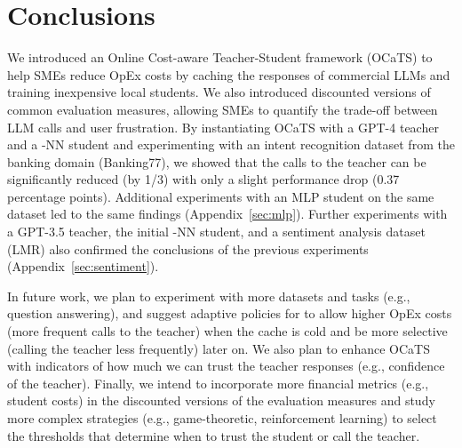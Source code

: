 \documentclass[11pt]{article}
\begin{document}
\section{Conclusions}
We introduced an Online Cost-aware Teacher-Student framework (OCaTS) to help SMEs reduce OpEx costs by caching the responses of commercial LLMs and training inexpensive local students. We also introduced discounted versions of common evaluation measures, allowing SMEs to quantify the trade-off between LLM calls and user frustration. By instantiating OCaTS with a GPT-4 teacher and a -NN student and experimenting with an intent recognition dataset from the banking domain (Banking77), we showed that the calls to the teacher can be significantly reduced (by 1/3) with only a slight performance drop (0.37 percentage points). Additional experiments with an MLP student  on the same dataset led to the same findings (Appendix~\ref{sec:mlp}). Further experiments with a GPT-3.5 teacher, the initial -NN student, and a sentiment analysis dataset (LMR) also confirmed the conclusions of the previous experiments (Appendix~\ref{sec:sentiment}).    

In future work, we plan to experiment with more datasets and tasks (e.g., question answering), and suggest adaptive policies for  to allow higher OpEx costs (more frequent calls to the teacher) when the cache is cold and be more selective (calling the teacher less frequently) later on. We also plan to enhance OCaTS with indicators of how much we can trust the teacher responses (e.g., confidence of the teacher). Finally, we intend to incorporate more financial metrics (e.g., student costs) in the discounted versions of the evaluation measures and study more complex strategies (e.g., game-theoretic, reinforcement learning) to select the thresholds that determine when to trust the student or call the teacher.
\end{document}
